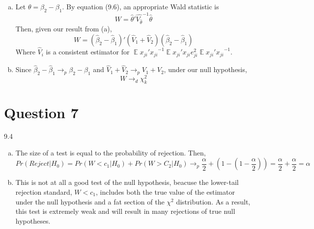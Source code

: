 \documentclass{article}
\newcommand{\bhat}{\hat{\beta}}
\DeclareMathOperator{\E}{\mathbb{E}}%
\begin{document}
\begin{itemize}
\begin{enumerate}[(a)]
			\item Let ${\theta = \beta_2-\beta_1}$. By equation (9.6), an appropriate Wald statistic is 
				\[
					W = \hat{\theta}'\hat{V_{\hat{\theta}}}^{-1}\hat{\theta}
				\]
				Then, given our result from (a),
				\[
					W = (\bhat_2-\bhat_1)'\left(\hat{V}_1 + \hat{V}_2\right)(\bhat_2-\bhat_1)
				\]
				Where $\hat{V}_i$ is a consistent estimator for ${\E{x_{ji}'x_{ji}}^{-1}\E{x_{ji}'x_{ji}e_{ji}^2}\E{x_{ji}'x_{ji}}^{-1}}$.
			
			\item Since ${\bhat_2-\bhat_1\rightarrow_p\beta_2-\beta_1}$ and ${\hat{V}_1 + \hat{V}_2\rightarrow_pV_1 + V_2}$, under our null hypothesis,
				\[
					W\rightarrow_d\chi^2_k
				\]
		
		\end{enumerate}
	
\end{itemize}



\section*{Question 7}
9.4
\begin{enumerate}[(a)]
	\item The size of a test is equal to the probability of rejection. Then,
		\[
			Pr(Reject|H_0) = Pr(W<c_1|H_0) + Pr(W>C_2|H_0) \rightarrow_p \frac{\alpha}{2}+(1-(1-\frac{\alpha}{2})) = \frac{\alpha}{2}+\frac{\alpha}{2} = \alpha
		\]
	
	\item This is not at all a good test of the null hypothesis, beacuse the lower-tail rejection standard, ${W<c_1}$, includes both the true value of the estimator under the null hypothesis and a fat section of the $\chi^2$ distribution. As a result, this test is extremely weak and will result in many rejections of true null hypotheses.
	
\end{enumerate}

\end{document}
